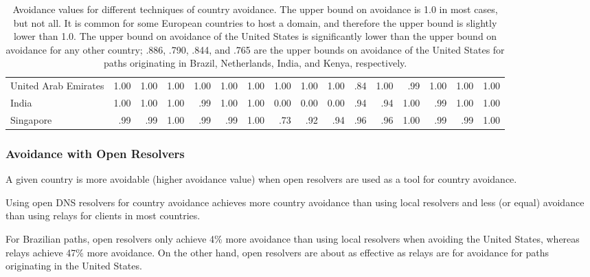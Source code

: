 \begin{table*}[t]
{\begin{tabular}{P{32mm}|d{3.2}d{3.2}d{3.2}|d{3.2}d{3.2}d{3.2}|d{3.2}d{3.2}d{3.2}|d{3.2}d{3.2}d{3.2}|d{3.2}d{3.2}d{3.2}}
United Arab Emirates &1.00  &1.00   &1.00     &1.00 &1.00 &1.00   &1.00 &1.00   &1.00  &.84 &1.00  &.99  &1.00 &1.00 &1.00  \\
India                &1.00  &1.00   &1.00     &.99 &1.00 &1.00   &0.00 &0.00   &0.00  &.94 &.94  &1.00  &.99 &1.00 &1.00  \\
Singapore            &.99  &.99   &1.00     &.99 &.99 &1.00   &.73  &.92  &.94  &.96 &.96  &1.00  &.99 &.99 &1.00  \\\midrule
\end{tabular}
}
\caption{Avoidance values for different techniques of country avoidance.  The upper bound on avoidance is 1.0 in most cases, but not all.  It is 
common for some European countries to host a domain, and therefore the upper bound is slightly lower than 1.0.  The upper bound on avoidance of the 
United States is significantly lower than the upper bound on avoidance for any other country; .886, .790, .844, and .765 are the upper bounds on avoidance 
of the United States for paths originating in Brazil, Netherlands, India, and Kenya, respectively.}
\label{tab:avoid}
\end{table*}

\subsubsection{Avoidance with Open Resolvers}

A given country is more avoidable (higher avoidance value) when open
resolvers are used as a tool for country avoidance. 

\begin{finding}
Using open DNS resolvers for country avoidance achieves more country
avoidance than using local resolvers and less (or equal)
avoidance than using relays for clients in most
countries. 
\end{finding}
\noindent
For Brazilian paths, open resolvers only achieve 4\% more avoidance than
using local resolvers when avoiding the United States, whereas relays
achieve 47\% more avoidance.  On the other hand, open resolvers are
about as effective as relays are for avoidance for paths originating in
the United States.   

